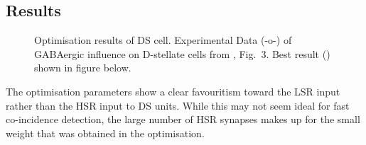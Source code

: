 \subsection{Results}


\begin{figure}[htb!]
  \centering
\caption{Optimisation results of DS cell. Experimental Data (-o-) of GABAergic influence on D-stellate cells from \citep{BackoffPalombiEtAl:1997}, Fig.~3.  Best result () shown in figure below.} \label{fig:DS_ClickRecovery_result}  
\end{figure}

The optimisation parameters show a clear favouritism toward the LSR input rather
than the HSR input to DS units. While this may not seem ideal for fast
co-incidence detection, the large number of HSR synapses makes up for the small
weight that was obtained in the optimisation.








